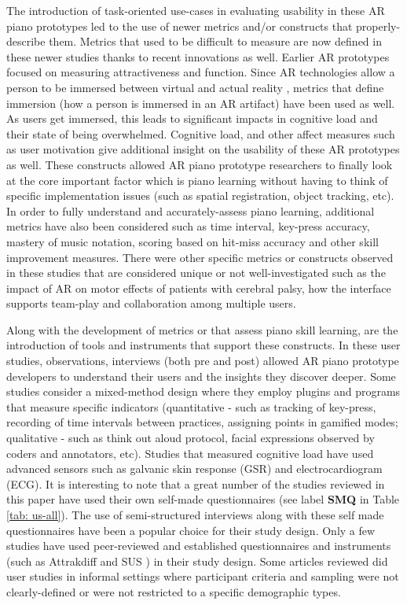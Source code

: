 \documentclass[manuscript,screen]{acmart}
\begin{document}
The introduction of task-oriented use-cases in evaluating usability in these AR piano prototypes led to the use of newer metrics and/or constructs that properly-describe them. Metrics that used to be difficult to measure are now defined in these newer studies thanks to recent innovations as well. Earlier AR prototypes focused on measuring attractiveness and function. Since AR technologies allow a person to be immersed between virtual and actual reality \cite{milgram1995augmented}, metrics that define immersion (how a person is immersed in an AR artifact) have been used as well. As users get immersed, this leads to significant impacts in cognitive load and their state of being overwhelmed. Cognitive load, and other affect measures such as user motivation give additional insight on the usability of these AR prototypes as well. These constructs allowed AR piano prototype researchers to finally look at the core important factor which is piano learning without having to think of specific implementation issues (such as spatial registration, object tracking, etc). In order to fully understand and accurately-assess piano learning, additional metrics have also been considered such as time interval, key-press accuracy, mastery of music notation, scoring based on hit-miss accuracy and other skill improvement measures. There were other specific metrics or constructs observed in these studies that are considered unique or not well-investigated such as the impact of AR on motor effects of patients with cerebral palsy, how the interface supports team-play and collaboration among multiple users. 

Along with the development of metrics or that assess piano skill learning, are the introduction of tools and instruments that support these constructs. In these user studies, observations, interviews (both pre and post) allowed AR piano prototype developers to understand their users and the insights they discover deeper. Some studies consider a mixed-method design where they employ plugins and programs that measure specific indicators (quantitative - such as tracking of key-press, recording of time intervals between practices, assigning points in gamified modes; qualitative - such as think out aloud protocol, facial expressions observed by coders and annotators, etc). Studies that measured cognitive load have used advanced sensors such as galvanic skin response (GSR) and electrocardiogram (ECG). It is interesting to note that a great number of the studies reviewed in this paper have used their own self-made questionnaires (see label \textbf{SMQ} in Table \ref{tab: us-all}). The use of semi-structured interviews along with these self made questionnaires have been a popular choice for their study design. Only a few studies have used peer-reviewed and established questionnaires and instruments (such as Attrakdiff \cite{hassenzahl2003attrakdiff} and SUS \cite{lewis2009factor})  in their study design. Some articles reviewed did user studies in informal settings where participant criteria and sampling were not clearly-defined or were not restricted to a specific demographic types. 
\end{document}
